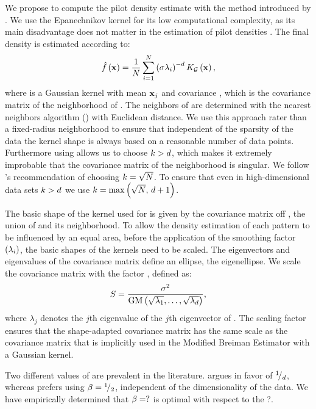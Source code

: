 We propose to compute the pilot density estimate with the method introduced by \citeauthor{wilkinson1995dataplot}. We use the Epanechnikov kernel for its low computational complexity, as its main disadvantage does not matter in the estimation of pilot densities \cite{silverman1986density}. 
The final density is estimated according to:
\begin{equation}
	\varEstimatedDensityFunction{\varPattern} = \frac{1}{\varNumPatterns} \sum_{i = 1}^{\varNumPatterns} \left(\varBandwidth\varLocalBandwidth{i}\right)^{-\varDim} \varKernel[\varGaussian]{\varPattern},
\end{equation}
where \varKernel[\varGaussian] is a Gaussian kernel with mean $\varPattern[j]$ and covariance \varCovarianceMatrix, 
which is the covariance matrix of the neighborhood of \varPattern. The neighbors of \varPattern are determined with the \KNNK nearest neighbors algorithm (\KNN) with Euclidean distance. We use this approach rater than a fixed-radius neighborhood to ensure that independent of the sparsity of the data the kernel shape is always based on a reasonable number of data points. Furthermore using \KNN allows us to choose $k > d$, which makes it extremely improbable that the covariance matrix of the neighborhood is singular. We follow \citeauthor{silverman1986density}'s \cite{silverman1986density} recommendation of choosing $k = \sqrt{N}$. To ensure that even in high-dimensional data sets $k > d$ we use $k = \max\left(\sqrt{N},\, d + 1\right)$.

The basic shape of the kernel used for \varPattern is given by the covariance matrix off \varNeighborhood{\varPattern[i]}, \ie the union of \varPattern and its neighborhood.
To allow the density estimation of each pattern to be influenced by an equal area, before the application of the smoothing factor $(\lambda_{i})$, the basic shapes of the kernels need to be scaled. The eigenvectors and eigenvalues of the covariance matrix define an ellipse, the eigenellipse. We scale the covariance matrix with the factor \varScalingFactor, defined as:
\begin{equation}
	S = \frac{\sigma^2}{\text{GM}\left(\sqrt{\lambda_1}, \dotsc, \sqrt{\lambda_d}\right)},
\end{equation}
where $\lambda_j$ denotes the $j$th eigenvalue of the $j$th eigenvector of \varCovarianceMatrix. The scaling factor \varScalingFactor ensures that the shape-adapted covariance matrix has the same scale as the covariance matrix that is implicitly used in the Modified Breiman Estimator with a Gaussian kernel.

Two different values of \varMBESensitivityParam are prevalent in the literature. \textcite{breiman1977variable} argues in favor of ${}^{1}\!/_{d}$, whereas \textcite{silverman1986density} prefers using $\beta = {}^{1}\!/_{2}$, independent of the dimensionality of the data. We have empirically determined that $\beta = ?$  is optimal with respect to the ?.